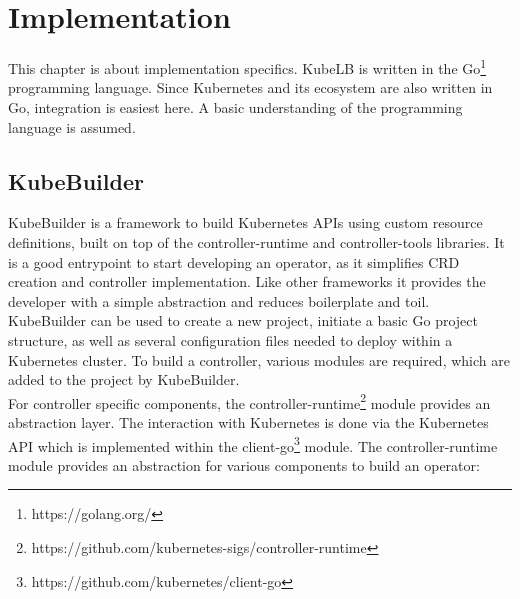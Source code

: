 \chapter{Implementation}

This chapter is about implementation specifics.
KubeLB is written in the Go\footnote{https://golang.org/} programming language.
Since Kubernetes and its ecosystem are also written in Go, integration is easiest here.
A basic understanding of the programming language is assumed.

\section{KubeBuilder}

KubeBuilder is a framework to build Kubernetes APIs using custom resource definitions, built on top of the controller-runtime and controller-tools libraries.
It is a good entrypoint to start developing an operator, as it simplifies CRD creation and controller implementation.
Like other frameworks it provides the developer with a simple abstraction and reduces boilerplate and toil.
\\
KubeBuilder can be used to create a new project, initiate a basic Go project structure, as well as several configuration files needed to deploy within a Kubernetes cluster.
To build a controller, various modules are required, which are added to the project by KubeBuilder.
\\
\newpage
For controller specific components, the controller-runtime\footnote{https://github.com/kubernetes-sigs/controller-runtime} module provides an abstraction layer.
The interaction with Kubernetes is done via the Kubernetes API which is implemented within the client-go\footnote{https://github.com/kubernetes/client-go} module.
The controller-runtime module provides an abstraction for various components to build an operator:

